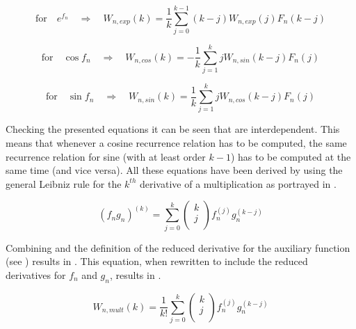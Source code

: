 \begin{equation} \label{eq:recRel5}
\text{for} \quad e^{f_{n}} \quad \Rightarrow \quad W_{n,exp}\left(k\right)= \dfrac{1}{k}\displaystyle\sum_{j=0}^{k-1}\left(k-j\right)W_{n,exp}\left(j\right)F_{n}\left(k-j\right)
\end{equation}

\begin{equation} \label{eq:recRel6}
\text{for} \quad \cos f_{n} \quad \Rightarrow \quad W_{n,cos}\left(k\right)= -\dfrac{1}{k}\displaystyle\sum_{j=1}^{k}jW_{n,sin}\left(k-j\right)F_{n}\left(j\right)
\end{equation}

\begin{equation} \label{eq:recRel7}
\text{for} \quad \sin f_{n}  \quad \Rightarrow \quad W_{n,sin}\left(k\right)= \dfrac{1}{k}\displaystyle\sum_{j=1}^{k}jW_{n,cos}\left(k-j\right)F_{n}\left(j\right)
\end{equation}

Checking the presented equations it can be seen that  are interdependent. This means that whenever a cosine recurrence relation has to be computed, the same recurrence relation for sine (with at least order $k-1$) has to be computed at the same time (and vice versa). All these equations have been derived by \cite{jorba2005software} using the general Leibniz rule for the $k^{th}$ derivative of a multiplication as portrayed in .

\begin{equation} \label{eq:Leibniz}
\left(f_{n}g_{n}\right)^{\left( k\right)}=\displaystyle\sum_{j=0}^{k}
\left(
\begin{matrix}
k\\
j\\
\end{matrix}
\right)
f_{n}^{\left( j\right)}g_{n}^{\left( k-j\right)}
\end{equation}

Combining  and the definition of the reduced derivative for the auxiliary function (see ) results in . This equation, when rewritten to include the reduced derivatives for $f_{n}$ and $g_{n}$, results in .

\begin{equation} \label{eq:LeibnizInt}
W_{n,mult}\left(k\right)=\dfrac{1}{k!}\displaystyle\sum_{j=0}^{k}
\left(
\begin{matrix}
k\\
j\\
\end{matrix}
\right)
f_{n}^{\left( j\right)}g_{n}^{\left( k-j\right)}
\end{equation}

